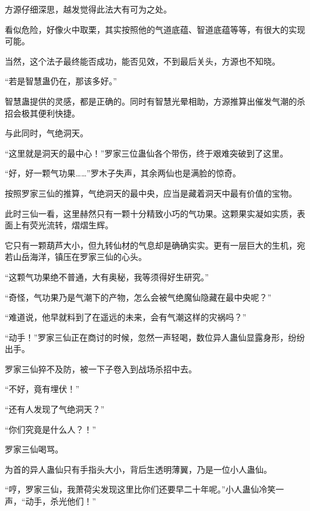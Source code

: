 \begin{this_body}
方源仔细深思，越发觉得此法大有可为之处。

看似危险，好像火中取栗，其实按照他的气道底蕴、智道底蕴等等，有很大的实现可能。

当然，这个法子最终能否成功，能否见效，不到最后关头，方源也不知晓。

“若是智慧蛊仍在，那该多好。”

智慧蛊提供的灵感，都是正确的。同时有智慧光晕相助，方源推算出催发气潮的杀招会极其便利快捷。

与此同时，气绝洞天。

“这里就是洞天的最中心！”罗家三位蛊仙各个带伤，终于艰难突破到了这里。

“好，好一颗气功果……”罗木子失声，其余两仙也是满脸的惊奇。

按照罗家三仙的推算，气绝洞天的最中央，应当是藏着洞天中最有价值的宝物。

此时三仙一看，这里赫然只有一颗十分精致小巧的气功果。这颗果实凝如实质，表面上有荧光流转，熠熠生辉。

它只有一颗葫芦大小，但九转仙材的气息却是确确实实。更有一层巨大的生机，宛若山岳海洋，镇压在罗家三仙的心头。

“这颗气功果绝不普通，大有奥秘，我等须得好生研究。”

“奇怪，气功果乃是气潮下的产物，怎么会被气绝魔仙隐藏在最中央呢？”

“难道说，他早就料到了在遥远的未来，会有气潮这样的灾祸吗？”

“动手！”罗家三仙正在商讨的时候，忽然一声轻喝，数位异人蛊仙显露身形，纷纷出手。

罗家三仙猝不及防，被一下子卷入到战场杀招中去。

“不好，竟有埋伏！”

“还有人发现了气绝洞天？”

“你们究竟是什么人？！”

罗家三仙喝骂。

为首的异人蛊仙只有手指头大小，背后生透明薄翼，乃是一位小人蛊仙。

“哼，罗家三仙，我萧荷尖发现这里比你们还要早二十年呢。”小人蛊仙冷笑一声，“动手，杀光他们！”

\end{this_body}

